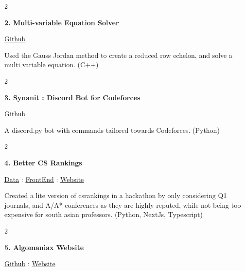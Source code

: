 \documentclass[10pt, letterpaper]{article}
\newenvironment{twocolentry}[2][]{
    \onecolentry
    \def\secondColumn{#2}
    \setcolumnwidth{\fill, 4.7 cm} %
    \begin{paracol}{2}
}{
    \switchcolumn \raggedleft \secondColumn
    \end{paracol}
    \endonecolentry
}
\begin{document}
        \vspace{0.4 cm} %

        \begin{twocolentry}{
            \href{https://github.com/Darelife/MultiEquationSolver}{Github}
        }
            \textbf{2. Multi-variable Equation Solver}
        \end{twocolentry}

        \vspace{0.15 cm} %
        Used the Gauss Jordan method to create a reduced row echelon, and solve a multi variable equation. (C++)

        \vspace{0.3 cm} %

        \begin{twocolentry}{
            \href{https://github.com/Darelife/synanit2.0}{Github}
        }
            \textbf{3. Synanit : Discord Bot for Codeforces}
        \end{twocolentry}

        \vspace{0.15 cm} %
        A discord.py bot with commands tailored towards Codeforces. (Python)

        \vspace{0.3 cm} %

        \begin{twocolentry}{%
            \href{https://github.com/Darelife/HackenzaHackathon}{Data} : 
            \href{https://github.com/arin-r/better-csrankings}{FrontEnd} : 
            \href{https://better-csrankings.vercel.app/}{Website}%
        }
            \textbf{4. Better CS Rankings}
        \end{twocolentry}

        \vspace{0.15 cm} %
        Created a lite version of csrankings in a hackathon by only considering Q1 journals, and A/A* conferences as they are highly reputed, while not being too expensive for south asian professors. (Python, NextJs, Typescript)

        \vspace{0.3 cm} %

        \begin{twocolentry}{
            \href{https://github.com/Darelife/AlgoXXX}{Github} : \href{https://algomaniax.vercel.app/}{Website}
        }
            \textbf{5. Algomaniax Website}
        \end{twocolentry}
\end{document}
